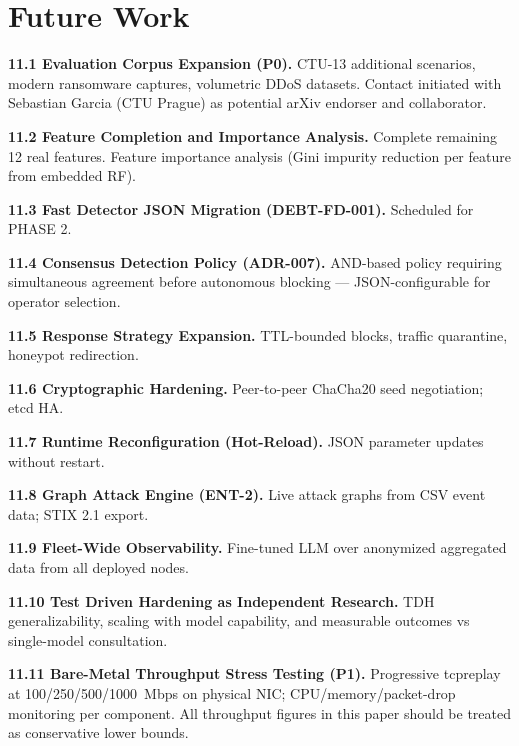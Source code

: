 \documentclass[11pt,a4paper]{article}
\begin{document}
    \section{Future Work}
    \label{sec:future}

    \textbf{11.1 Evaluation Corpus Expansion (P0).}
    \label{sec:future:corpus}
    CTU-13 additional scenarios, modern ransomware captures, volumetric DDoS datasets. Contact
    initiated with Sebastian Garcia (CTU Prague) as potential arXiv endorser and collaborator.

    \textbf{11.2 Feature Completion and Importance Analysis.}
    Complete remaining 12 real features. Feature importance analysis (Gini impurity reduction
    per feature from embedded RF).

    \textbf{11.3 Fast Detector JSON Migration (DEBT-FD-001).} Scheduled for PHASE 2.

    \textbf{11.4 Consensus Detection Policy (ADR-007).}
    \label{sec:future:consensus}
    AND-based policy requiring simultaneous agreement before autonomous blocking ---
    JSON-configurable for operator selection.

    \textbf{11.5 Response Strategy Expansion.}
    \label{sec:future:response}
    TTL-bounded blocks, traffic quarantine, honeypot redirection.

    \textbf{11.6 Cryptographic Hardening.} Peer-to-peer ChaCha20 seed negotiation; etcd HA.

    \textbf{11.7 Runtime Reconfiguration (Hot-Reload).} JSON parameter updates without restart.

    \textbf{11.8 Graph Attack Engine (ENT-2).} Live attack graphs from CSV event data; STIX 2.1
    export.

    \textbf{11.9 Fleet-Wide Observability.} Fine-tuned LLM over anonymized aggregated data from
    all deployed nodes.

    \textbf{11.10 Test Driven Hardening as Independent Research.} TDH generalizability, scaling
    with model capability, and measurable outcomes vs single-model consultation.

    \textbf{11.11 Bare-Metal Throughput Stress Testing (P1).}
    \label{sec:future:baremetal}
    Progressive tcpreplay at 100/250/500/1000~Mbps on physical NIC; CPU/memory/packet-drop
    monitoring per component. All throughput figures in this paper should be treated as
    conservative lower bounds.
\end{document}
